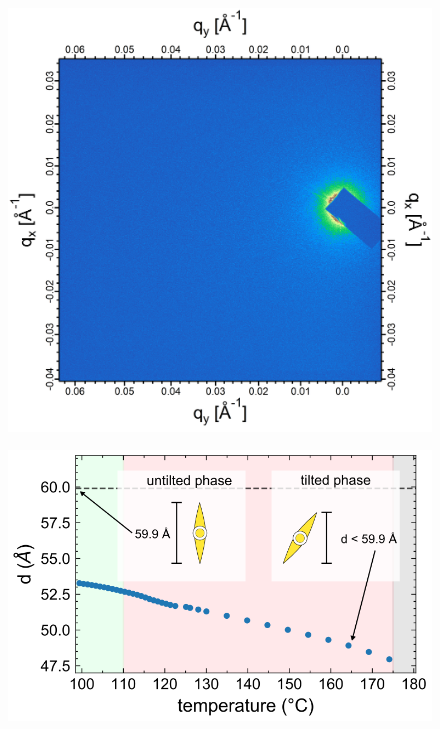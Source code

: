 \documentclass[aagreenthesis]{subfiles}
\begin{document}
\begin{figure}[h!]
    \centering
    \includegraphics[width=.8\textwidth]{figs/pal30/xraysm1/rsosxSmaT113-modified.png}
    \caption{\label{}}
\end{figure}


\begin{figure}[h!]
    \centering
    \includegraphics{figs/pal30/xraysm1/sm1-saxs-annote.png}
    \caption{\label{}}
\end{figure}
\end{document}
